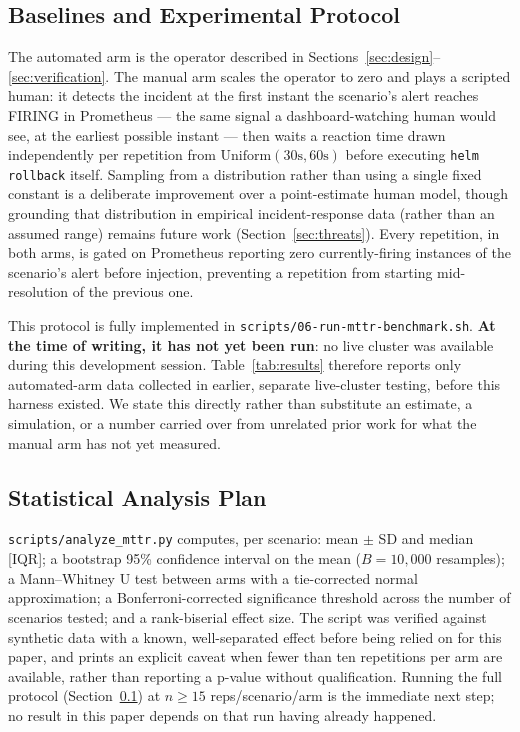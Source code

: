 \documentclass[conference]{IEEEtran}
\begin{document}
\subsection{Baselines and Experimental Protocol}
\label{sec:protocol}
The automated arm is the operator described in Sections~\ref{sec:design}--\ref{sec:verification}. The manual arm scales the operator to zero and plays a scripted human: it detects the incident at the first instant the scenario's alert reaches FIRING in Prometheus --- the same signal a dashboard-watching human would see, at the earliest possible instant --- then waits a reaction time drawn independently per repetition from $\mathrm{Uniform}(30\mathrm{s}, 60\mathrm{s})$ before executing \texttt{helm rollback} itself. Sampling from a distribution rather than using a single fixed constant is a deliberate improvement over a point-estimate human model, though grounding that distribution in empirical incident-response data (rather than an assumed range) remains future work (Section~\ref{sec:threats}). Every repetition, in both arms, is gated on Prometheus reporting zero currently-firing instances of the scenario's alert before injection, preventing a repetition from starting mid-resolution of the previous one.

This protocol is fully implemented in \texttt{scripts/06-run-mttr-benchmark.sh}. \textbf{At the time of writing, it has not yet been run}: no live cluster was available during this development session. Table~\ref{tab:results} therefore reports only automated-arm data collected in earlier, separate live-cluster testing, before this harness existed. We state this directly rather than substitute an estimate, a simulation, or a number carried over from unrelated prior work for what the manual arm has not yet measured.

\subsection{Statistical Analysis Plan}
\texttt{scripts/analyze\_mttr.py} computes, per scenario: mean $\pm$ SD and median [IQR]; a bootstrap 95\% confidence interval on the mean ($B=10{,}000$ resamples); a Mann--Whitney U test between arms with a tie-corrected normal approximation; a Bonferroni-corrected significance threshold across the number of scenarios tested; and a rank-biserial effect size. The script was verified against synthetic data with a known, well-separated effect before being relied on for this paper, and prints an explicit caveat when fewer than ten repetitions per arm are available, rather than reporting a p-value without qualification. Running the full protocol (Section~\ref{sec:protocol}) at $n \geq 15$ reps/scenario/arm is the immediate next step; no result in this paper depends on that run having already happened.
\end{document}
